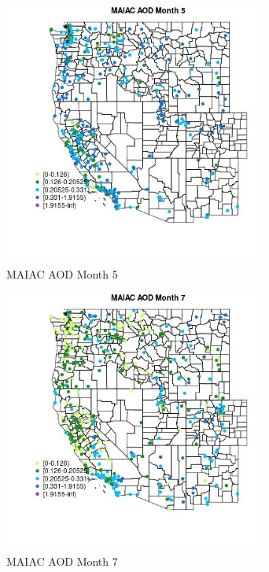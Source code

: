 \begin{figure} 
\centering  
\includegraphics[width=0.77\textwidth]{Code_Outputs/Report_ML_input_PM25_Step4_part_e_de_duplicated_aves_compiled_2019-05-18wNAs_MapObsMo5MAIAC_AOD.jpg} 
\caption{\label{fig:Report_ML_input_PM25_Step4_part_e_de_duplicated_aves_compiled_2019-05-18wNAsMapObsMo5MAIAC_AOD}MAIAC AOD Month 5} 
\end{figure} 
 

\clearpage 

\begin{figure} 
\centering  
\includegraphics[width=0.77\textwidth]{Code_Outputs/Report_ML_input_PM25_Step4_part_e_de_duplicated_aves_compiled_2019-05-18wNAs_MapObsMo7MAIAC_AOD.jpg} 
\caption{\label{fig:Report_ML_input_PM25_Step4_part_e_de_duplicated_aves_compiled_2019-05-18wNAsMapObsMo7MAIAC_AOD}MAIAC AOD Month 7} 
\end{figure} 
 

